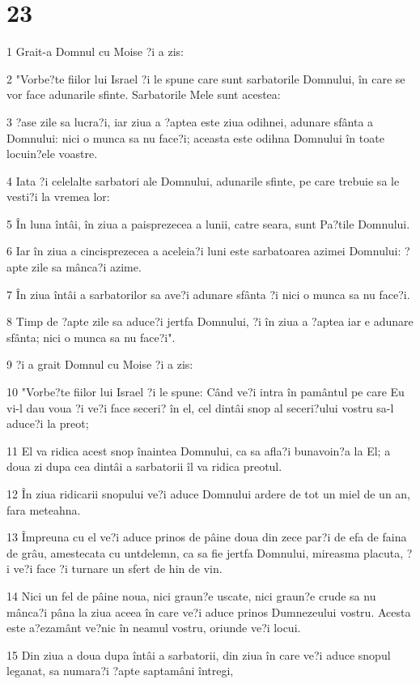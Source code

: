 \chapter{23}

\par 1 Grait-a Domnul cu Moise ?i a zis:
\par 2 "Vorbe?te fiilor lui Israel ?i le spune care sunt sarbatorile Domnului, în care se vor face adunarile sfinte. Sarbatorile Mele sunt acestea:
\par 3 ?ase zile sa lucra?i, iar ziua a ?aptea este ziua odihnei, adunare sfânta a Domnului: nici o munca sa nu face?i; aceasta este odihna Domnului în toate locuin?ele voastre.
\par 4 Iata ?i celelalte sarbatori ale Domnului, adunarile sfinte, pe care trebuie sa le vesti?i la vremea lor:
\par 5 În luna întâi, în ziua a paisprezecea a lunii, catre seara, sunt Pa?tile Domnului.
\par 6 Iar în ziua a cincisprezecea a aceleia?i luni este sarbatoarea azimei Domnului: ?apte zile sa mânca?i azime.
\par 7 În ziua întâi a sarbatorilor sa ave?i adunare sfânta ?i nici o munca sa nu face?i.
\par 8 Timp de ?apte zile sa aduce?i jertfa Domnului, ?i în ziua a ?aptea iar e adunare sfânta; nici o munca sa nu face?i".
\par 9 ?i a grait Domnul cu Moise ?i a zis:
\par 10 "Vorbe?te fiilor lui Israel ?i le spune: Când ve?i intra în pamântul pe care Eu vi-l dau voua ?i ve?i face seceri? în el, cel dintâi snop al seceri?ului vostru sa-l aduce?i la preot;
\par 11 El va ridica acest snop înaintea Domnului, ca sa afla?i bunavoin?a la El; a doua zi dupa cea dintâi a sarbatorii îl va ridica preotul.
\par 12 În ziua ridicarii snopului ve?i aduce Domnului ardere de tot un miel de un an, fara meteahna.
\par 13 Împreuna cu el ve?i aduce prinos de pâine doua din zece par?i de efa de faina de grâu, amestecata cu untdelemn, ca sa fie jertfa Domnului, mireasma placuta, ?i ve?i face ?i turnare un sfert de hin de vin.
\par 14 Nici un fel de pâine noua, nici graun?e uscate, nici graun?e crude sa nu mânca?i pâna la ziua aceea în care ve?i aduce prinos Dumnezeului vostru. Acesta este a?ezamânt ve?nic în neamul vostru, oriunde ve?i locui.
\par 15 Din ziua a doua dupa întâi a sarbatorii, din ziua în care ve?i aduce snopul leganat, sa numara?i ?apte saptamâni întregi,
